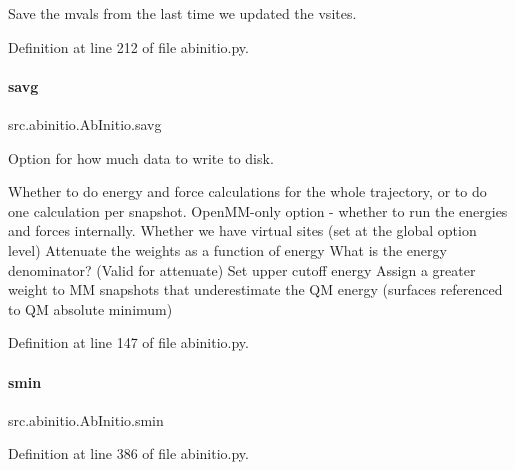 Save the mvals from the last time we updated the vsites. 



Definition at line 212 of file abinitio.\+py.

\mbox{\label{classsrc_1_1abinitio_1_1AbInitio_a2a0e84edd38e6d52983769ac338d704e}} 
\paragraph{\texorpdfstring{savg}{savg}}
{\footnotesize\ttfamily src.\+abinitio.\+Ab\+Initio.\+savg}



Option for how much data to write to disk. 

Whether to do energy and force calculations for the whole trajectory, or to do one calculation per snapshot. Open\+M\+M-\/only option -\/ whether to run the energies and forces internally. Whether we have virtual sites (set at the global option level) Attenuate the weights as a function of energy What is the energy denominator? (Valid for \textquotesingle{}attenuate\textquotesingle{}) Set upper cutoff energy Assign a greater weight to MM snapshots that underestimate the QM energy (surfaces referenced to QM absolute minimum) 

Definition at line 147 of file abinitio.\+py.

\mbox{\label{classsrc_1_1abinitio_1_1AbInitio_aabd18cb0c7bd1a27ae43afeec60a50ed}} 
\paragraph{\texorpdfstring{smin}{smin}}
{\footnotesize\ttfamily src.\+abinitio.\+Ab\+Initio.\+smin}



Definition at line 386 of file abinitio.\+py.

\mbox{\label{classsrc_1_1abinitio_1_1AbInitio_a46a8768385f6e3e9db715b175a5285c6}} 

